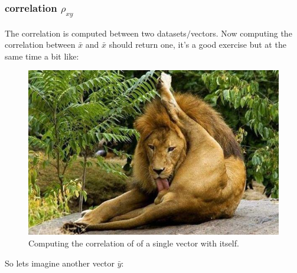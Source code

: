\subsubsection{correlation $\rho_{xy}$}
The correlation is computed between two datasets$/$vectors. Now computing the correlation between $\bar{x}$ and $\bar{x}$ should return one, it's a good exercise but at the same time a bit like:
\begin{figure}
    \centering
    \includegraphics{images/lion.jpg}
    \caption{Computing the correlation of of a single vector with itself.}
    \label{fig:my_label}
\end{figure}
So lets imagine another vector $\bar{y}$:
